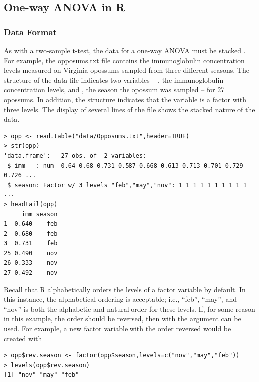 \documentclass[10pt,openany]{book}\usepackage[]{graphicx}\usepackage[]{color}
\makeatletter
\newenvironment{kframe}{%
 \def\at@end@of@kframe{}%
 \ifinner\ifhmode%
  \def\at@end@of@kframe{\end{minipage}}%
  \begin{minipage}{\columnwidth}%
 \fi\fi%
 \def\FrameCommand##1{\hskip\@totalleftmargin \hskip-\fboxsep
 \colorbox{shadecolor}{##1}\hskip-\fboxsep
     \hskip-\linewidth \hskip-\@totalleftmargin \hskip\columnwidth}%
 \MakeFramed {\advance\hsize-\width
   \@totalleftmargin\z@ \linewidth\hsize
   \@setminipage}}%
 {\par\unskip\endMakeFramed%
 \at@end@of@kframe}
\newenvironment{knitrout}{}{} %
\makeatother
\begin{document}
\subsection{One-way ANOVA in R}
\subsubsection*{Data Format}
As with a two-sample t-test, the data for a one-way ANOVA must be stacked .  For example, the \href{https://sites.google.com/site/ncstats/data/Opposums.txt}{opposums.txt} file contains the immunoglobulin concentration levels measured on Virginia opossums sampled from three different seasons.  The structure of the data file indicates two variables -- , the immunoglobulin concentration levels, and , the season the opossum was sampled -- for 27 opossums.  In addition, the  structure indicates that the  variable is a factor with three levels.  The display of several lines of the file shows the stacked nature of the data.

\begin{knitrout}
\color{fgcolor}\begin{kframe}
\begin{verbatim}
> opp <- read.table("data/Opposums.txt",header=TRUE)
> str(opp)
'data.frame':	27 obs. of  2 variables:
 $ imm   : num  0.64 0.68 0.731 0.587 0.668 0.613 0.713 0.701 0.729 0.726 ...
 $ season: Factor w/ 3 levels "feb","may","nov": 1 1 1 1 1 1 1 1 1 1 ...
> headtail(opp)
     imm season
1  0.640    feb
2  0.680    feb
3  0.731    feb
25 0.490    nov
26 0.333    nov
27 0.492    nov
\end{verbatim}
\end{kframe}
\end{knitrout}

Recall that R alphabetically orders the levels of a factor variable by default.  In this instance, the alphabetical ordering is acceptable; i.e., ``feb'', ``may'', and ``nov'' is both the alphabetic and natural order for these levels.  If, for some reason in this example, the order should be reversed, then  with the  argument can be used.  For example, a new factor variable with the order reversed would be created with

\begin{knitrout}
\color{fgcolor}\begin{kframe}
\begin{verbatim}
> opp$rev.season <- factor(opp$season,levels=c("nov","may","feb"))
> levels(opp$rev.season)
[1] "nov" "may" "feb"
\end{verbatim}
\end{kframe}
\end{knitrout}
\end{document}
